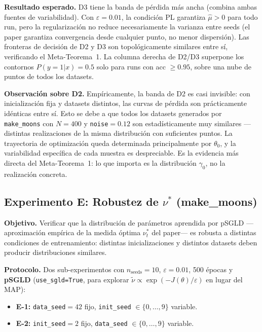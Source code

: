 \documentclass[11pt, a4paper]{article}
\theoremstyle{definition}
\begin{document}
\textbf{Resultado esperado.} D3 tiene la banda de pérdida más ancha (combina
ambas fuentes de variabilidad). Con $\varepsilon = 0.01$, la condición PL
garantiza $\hat{\mu} > 0$ para todo run, pero la regularización no reduce
necesariamente la varianza entre seeds (el paper garantiza convergencia desde
cualquier punto, no menor dispersión). Las fronteras de decisión de D2 y D3
son topológicamente similares entre sí, verificando el Meta-Teorema~1.
La columna derecha de D2/D3 superpone los contornos $P(y=1|x) = 0.5$
solo para runs con acc $\geq 0.95$, sobre una nube de puntos de todos los
datasets.

\textbf{Observación sobre D2.} Empíricamente, la banda de D2 es casi
invisible: con inicialización fija y datasets distintos, las curvas de
pérdida son prácticamente idénticas entre sí. Esto se debe a que todos los
datasets generados por \texttt{make\_moons} con $N=400$ y \texttt{noise}$=0.12$
son estadísticamente muy similares — distintas realizaciones de la misma
distribución con suficientes puntos. La trayectoria de optimización queda
determinada principalmente por $\theta_0$, y la variabilidad específica de
cada muestra es despreciable. Es la evidencia más directa del Meta-Teorema~1:
lo que importa es la distribución $\gamma_0$, no la realización concreta.

\subsection{Experimento E: Robustez de $\nu^*$ (make\_moons)}

\textbf{Objetivo.} Verificar que la distribución de parámetros aprendida por
pSGLD ---aproximación empírica de la medida óptima $\nu^*_t$ del paper--- es
robusta a distintas condiciones de entrenamiento: distintas inicializaciones
y distintos datasets deben producir distribuciones similares.

\textbf{Protocolo.} Dos sub-experimentos con $n_\text{seeds} = 10$,
$\varepsilon = 0.01$, 500 épocas y \textbf{pSGLD} (\texttt{use\_sgld=True},
para explorar $\tilde{\nu} \propto \exp(-J(\theta)/\varepsilon)$ en lugar del MAP):
\begin{itemize}
  \item \textbf{E-1:} \texttt{data\_seed}$=42$ fijo, \texttt{init\_seed}
        $\in \{0,\ldots,9\}$ variable.
  \item \textbf{E-2:} \texttt{init\_seed}$=2$ fijo, \texttt{data\_seed}
        $\in \{0,\ldots,9\}$ variable.
\end{itemize}
\end{document}

